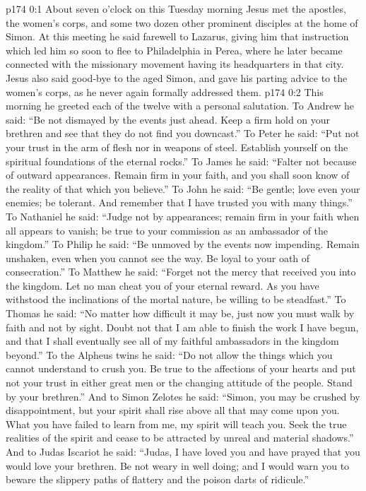 \author{Midwayer Commission}
\vs p174 0:1 About seven o’clock on this Tuesday morning Jesus met the apostles, the women’s corps, and some two dozen other prominent disciples at the home of Simon. At this meeting he said farewell to Lazarus, giving him that instruction which led him so soon to flee to Philadelphia in Perea, where he later became connected with the missionary movement having its headquarters in that city. Jesus also said good\hyp{}bye to the aged Simon, and gave his parting advice to the women’s corps, as he never again formally addressed them.
\vs p174 0:2 This morning he greeted each of the twelve with a personal salutation. To Andrew he said: \textcolor{ubdarkred}{“Be not dismayed by the events just ahead. Keep a firm hold on your brethren and see that they do not find you downcast.”} To Peter he said: \textcolor{ubdarkred}{“Put not your trust in the arm of flesh nor in weapons of steel. Establish yourself on the spiritual foundations of the eternal rocks.”} To James he said: \textcolor{ubdarkred}{“Falter not because of outward appearances. Remain firm in your faith, and you shall soon know of the reality of that which you believe.”} To John he said: \textcolor{ubdarkred}{“Be gentle; love even your enemies; be tolerant. And remember that I have trusted you with many things.”} To Nathaniel he said: \textcolor{ubdarkred}{“Judge not by appearances; remain firm in your faith when all appears to vanish; be true to your commission as an ambassador of the kingdom.”} To Philip he said: \textcolor{ubdarkred}{“Be unmoved by the events now impending. Remain unshaken, even when you cannot see the way. Be loyal to your oath of consecration.”} To Matthew he said: \textcolor{ubdarkred}{“Forget not the mercy that received you into the kingdom. Let no man cheat you of your eternal reward. As you have withstood the inclinations of the mortal nature, be willing to be steadfast.”} To Thomas he said: \textcolor{ubdarkred}{“No matter how difficult it may be, just now you must walk by faith and not by sight. Doubt not that I am able to finish the work I have begun, and that I shall eventually see all of my faithful ambassadors in the kingdom beyond.”} To the Alpheus twins he said: \textcolor{ubdarkred}{“Do not allow the things which you cannot understand to crush you. Be true to the affections of your hearts and put not your trust in either great men or the changing attitude of the people. Stand by your brethren.”} And to Simon Zelotes he said: \textcolor{ubdarkred}{“Simon, you may be crushed by disappointment, but your spirit shall rise above all that may come upon you. What you have failed to learn from me, my spirit will teach you. Seek the true realities of the spirit and cease to be attracted by unreal and material shadows.”} And to Judas Iscariot he said: \textcolor{ubdarkred}{“Judas, I have loved you and have prayed that you would love your brethren. Be not weary in well doing; and I would warn you to beware the slippery paths of flattery and the poison darts of ridicule.”}\plusone
